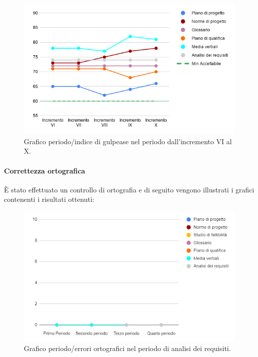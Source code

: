 \begin{figure}[H]
	\centering
	\includegraphics[width=0.8\linewidth]{./res/images/gulpease_3.png}
	\caption{Grafico periodo/indice di gulpease nel periodo dall'incremento VI al X.}
	\label{fig:Grafico indice di gulpease periodo dall'incremento VI al X.}
\end{figure}

\paragraph{Correttezza ortografica}
È stato effettuato un controllo di ortografia e di seguito vengono illustrati i grafici contenenti i risultati ottenuti:

\begin{figure}[H]
	\centering
	\includegraphics[width=0.8\linewidth]{./res/images/ortografia_1.png}
	\caption{Grafico periodo/errori ortografici nel periodo di analisi dei requisiti.}
	\label{fig:Grafico errori ortografici durante il periodo di analisi dei requisiti.}
\end{figure}

